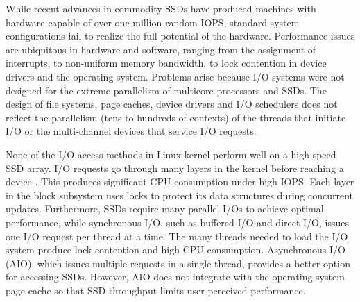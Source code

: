While recent advances in commodity SSDs have
produced machines with hardware capable of over one million random IOPS,
standard system configurations fail to realize the full potential 
of the hardware. 
Performance issues are ubiquitous in hardware and software, ranging from the assignment of interrupts, to non-uniform
memory bandwidth, to lock contention in device drivers and the operating system.
Problems arise because I/O systems were not designed for the extreme
parallelism of multicore processors and SSDs.  The design of file systems, page caches, device
drivers and I/O schedulers does not reflect the parallelism (tens to hundreds of contexts)
of the threads that initiate I/O or the multi-channel devices that service I/O requests.



None of the I/O access methods in Linux kernel perform well on a high-speed SSD array.
I/O requests go through many layers in the kernel before reaching a device \cite{Foong10}.
This produces significant CPU consumption under high IOPS.
Each layer in the block subsystem uses locks to protect its data
structures during concurrent updates. Furthermore, SSDs require many parallel
I/Os to achieve optimal performance, while synchronous I/O, 
such as buffered I/O and direct I/O, issues one I/O request per thread at a time.
The many threads needed to load the I/O system produce lock contention
and high CPU consumption.
%
Asynchronous I/O (AIO), which issues multiple requests in a single thread, provides a better
option for accessing SSDs. However, AIO does not integrate with the operating 
system page cache so that SSD throughput limits user-perceived performance.

